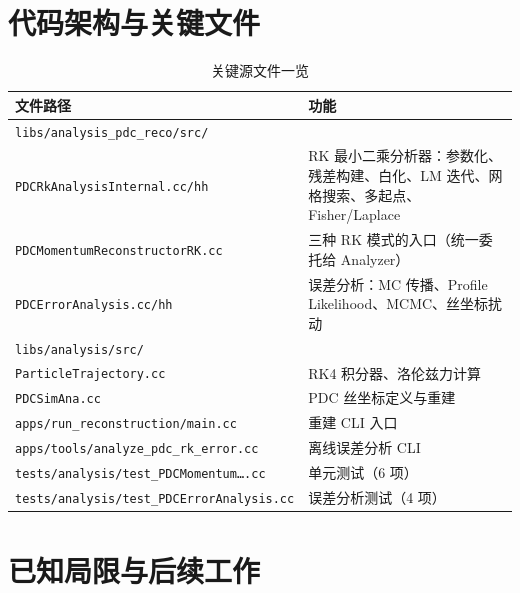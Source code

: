 \documentclass[a4paper, 11pt]{article}
\begin{document}
\section{代码架构与关键文件}

\begin{table}[H]
\centering
\caption{关键源文件一览}
\small
\begin{tabular}{p{7cm}p{7cm}}
\toprule
文件路径 & 功能 \\
\midrule
\texttt{libs/analysis\_pdc\_reco/src/}\ & \\
\quad\texttt{PDCRkAnalysisInternal.cc/hh} & RK 最小二乘分析器：参数化、残差构建、白化、LM 迭代、网格搜索、多起点、Fisher/Laplace \\
\quad\texttt{PDCMomentumReconstructorRK.cc} & 三种 RK 模式的入口（统一委托给 Analyzer） \\
\quad\texttt{PDCErrorAnalysis.cc/hh} & 误差分析：MC 传播、Profile Likelihood、MCMC、丝坐标扰动 \\
\midrule
\texttt{libs/analysis/src/}\ & \\
\quad\texttt{ParticleTrajectory.cc} & RK4 积分器、洛伦兹力计算 \\
\quad\texttt{PDCSimAna.cc} & PDC 丝坐标定义与重建 \\
\midrule
\texttt{apps/run\_reconstruction/main.cc} & 重建 CLI 入口 \\
\texttt{apps/tools/analyze\_pdc\_rk\_error.cc} & 离线误差分析 CLI \\
\texttt{tests/analysis/test\_PDCMomentum\dots.cc} & 单元测试（6 项） \\
\texttt{tests/analysis/test\_PDCErrorAnalysis.cc} & 误差分析测试（4 项） \\
\bottomrule
\end{tabular}
\end{table}

\section{已知局限与后续工作}
\end{document}
